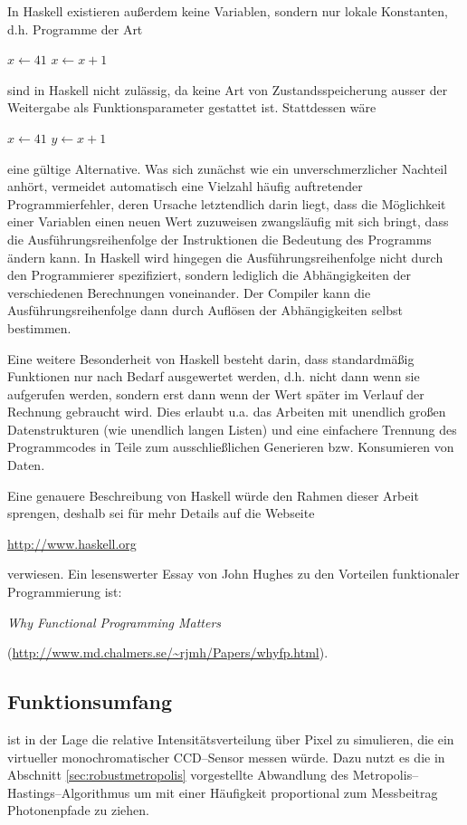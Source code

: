 	In Haskell existieren außerdem keine Variablen, sondern nur lokale Konstanten, d.h. Programme der Art
		\begin{algorithmic}
			\STATE $x\leftarrow 41$
			\STATE $x\leftarrow x+1$
		\end{algorithmic}
	sind in Haskell nicht zulässig, da keine Art von Zustandsspeicherung ausser der Weitergabe als Funktionsparameter gestattet ist. Stattdessen wäre
		\begin{algorithmic}
			\STATE $x\leftarrow 41$
			\STATE $y\leftarrow x+1$
		\end{algorithmic}
	eine gültige Alternative. Was sich zunächst wie ein unverschmerzlicher Nachteil anhört, vermeidet automatisch eine Vielzahl häufig auftretender Programmierfehler, deren Ursache letztendlich darin liegt, dass die Möglichkeit einer Variablen einen neuen Wert zuzuweisen zwangsläufig mit sich bringt, dass die Ausführungsreihenfolge der Instruktionen die Bedeutung des Programms ändern kann. In Haskell wird hingegen die Ausführungsreihenfolge nicht durch den Programmierer spezifiziert, sondern lediglich die Abhängigkeiten der verschiedenen Berechnungen voneinander. Der Compiler kann die Aus\-führ\-ungs\-rei\-hen\-fol\-ge dann durch Auflösen der Abhängigkeiten selbst bestimmen.
	
	Eine weitere Besonderheit von Haskell besteht darin, dass standardmäßig Funktionen nur nach Bedarf ausgewertet werden, d.h. nicht dann wenn sie aufgerufen werden, sondern erst dann wenn der Wert später im Verlauf der Rechnung gebraucht wird. Dies erlaubt u.a. das Arbeiten mit unendlich großen Datenstrukturen (wie unendlich langen Listen) und eine einfachere Trennung des  Programmcodes in Teile zum ausschließlichen Generieren bzw. Konsumieren von Daten.
		
	Eine genauere Beschreibung von Haskell würde den Rahmen dieser Arbeit sprengen, deshalb sei für mehr Details auf die Webseite
	
	\url{http://www.haskell.org}
	
	verwiesen. Ein lesenswerter Essay von John Hughes zu den Vorteilen funktionaler Programmierung ist:
	
	{\em Why Functional Programming Matters}
	
	(\url{http://www.md.chalmers.se/~rjmh/Papers/whyfp.html}).
	
	
	\subsection{Funktionsumfang}
	\pirate ist in der Lage die relative Intensitätsverteilung über Pixel zu simulieren, die ein virtueller monochromatischer CCD--Sensor messen würde. Dazu nutzt es die in Abschnitt \ref{sec:robustmetropolis} vorgestellte Abwandlung des Metropolis--Hastings--Algorithmus um mit einer Häufigkeit proportional zum Messbeitrag Photonenpfade zu ziehen.
	
